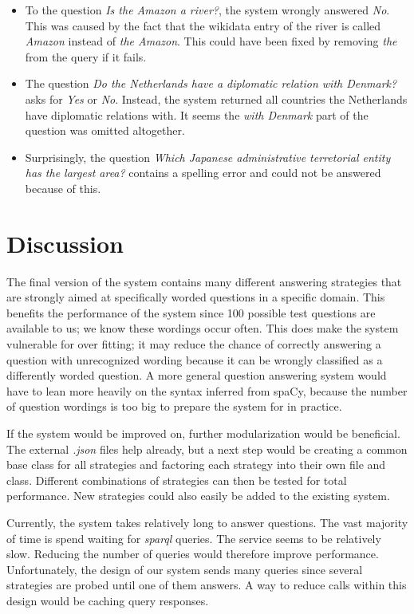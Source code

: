 \documentclass{article}
\begin{document}
\begin{itemize}
    \item To the question \emph{Is the Amazon a river?}, the system wrongly answered \emph{No}. This was caused by the fact that the wikidata entry of the river is called \emph{Amazon} instead of \emph{the Amazon}. This could have been fixed by removing \emph{the} from the query if it fails.
    \item The question \emph{Do the Netherlands have a diplomatic relation with Denmark?} asks for \emph{Yes} or \emph{No}. Instead, the system returned all countries the Netherlands have diplomatic relations with. It seems the \emph{with Denmark} part of the question was omitted altogether.
    \item Surprisingly, the question \emph{Which Japanese administrative terretorial entity has the largest area?} contains a spelling error and could not be answered because of this.
\end{itemize}

\section{Discussion}
The final version of the system contains many different answering strategies that are strongly aimed at specifically worded questions in a specific domain. This benefits the performance of the system since 100 possible test questions are available to us; we know these wordings occur often. This does make the system vulnerable for over fitting; it may reduce the chance of correctly answering a question with unrecognized wording because it can be wrongly classified as a differently worded question. A more general question answering system would have to lean more heavily on the syntax inferred from spaCy, because the number of question wordings is too big to prepare the system for in practice.

If the system would be improved on, further modularization would be beneficial. The external \emph{.json} files help already, but a next step would be creating a common base class for all strategies and factoring each strategy into their own file and class. Different combinations of strategies can then be tested for total performance. New strategies could also easily be added to the existing system.

Currently, the system takes relatively long to answer questions. The vast majority of time is spend waiting for \emph{sparql} queries. The service seems to be relatively slow. Reducing the number of queries would therefore improve performance. Unfortunately, the design of our system sends many queries since several strategies are probed until one of them answers. A way to reduce calls within this design would be caching query responses.
\end{document}
